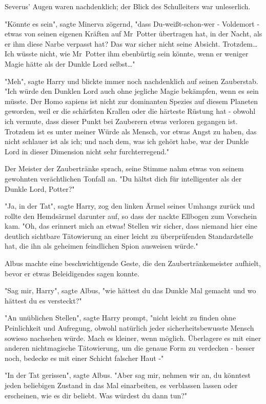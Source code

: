 {Severus' Augen waren nachdenklich; der Blick des Schulleiters war unleserlich.

"Könnte es sein", sagte Minerva zögernd, "dass Du-weißt-schon-wer - Voldemort - etwas von seinen eigenen Kräften auf Mr~Potter übertragen hat, in der Nacht, als er ihm diese Narbe verpasst hat? Das war sicher nicht seine Absicht. Trotzdem… Ich wüsste nicht, wie Mr~Potter ihm ebenbürtig sein könnte, wenn er weniger Magie hätte als der Dunkle Lord selbst…"

"Meh", sagte Harry und blickte immer noch nachdenklich auf seinen Zauberstab. "Ich würde den Dunklen Lord auch ohne jegliche Magie bekämpfen, wenn es sein müsste. Der Homo sapiens ist nicht zur dominanten Spezies auf diesem Planeten geworden, weil er die schärfsten Krallen oder die härteste Rüstung hat - obwohl ich vermute, dass dieser Punkt bei Zauberern etwas verloren gegangen ist. Trotzdem ist es unter meiner Würde als Mensch, vor etwas Angst zu haben, das nicht schlauer ist als ich; und nach dem, was ich gehört habe, war der Dunkle Lord in dieser Dimension nicht sehr furchterregend."

Der Meister der Zaubertränke sprach, seine Stimme nahm etwas von seinem gewohnten verächtlichen Tonfall an. "Du hältst dich für intelligenter als der Dunkle Lord, Potter?"

"Ja, in der Tat", sagte Harry, zog den linken Ärmel seines Umhangs zurück und rollte den Hemdsärmel darunter auf, so dass der nackte Ellbogen zum Vorschein kam. "Oh, das erinnert mich an etwas! Stellen wir sicher, dass niemand hier eine deutlich sichtbare Tätowierung an einer leicht zu überprüfenden Standardstelle hat, die ihn als geheimen feindlichen Spion ausweisen würde."

Albus machte eine beschwichtigende Geste, die den Zaubertränkemeister aufhielt, bevor er etwas Beleidigendes sagen konnte.

"Sag mir, Harry", sagte Albus, "wie hättest du das Dunkle Mal gemacht und wo hättest du es versteckt?"

"An unüblichen Stellen", sagte Harry prompt, "nicht leicht zu finden ohne Peinlichkeit und Aufregung, obwohl natürlich jeder sicherheitsbewusste Mensch sowieso nachsehen würde. Mach es kleiner, wenn möglich. Überlagere es mit einer anderen nichtmagische Tätowierung, um die genaue Form zu verdecken - besser noch, bedecke es mit einer Schicht falscher Haut -"

"In der Tat gerissen", sagte Albus. "Aber sag mir, nehmen wir an, du könntest jeden beliebigen Zustand in das Mal einarbeiten, es verblassen lassen oder erscheinen, wie es dir beliebt. Was würdest du dann tun?"

}
